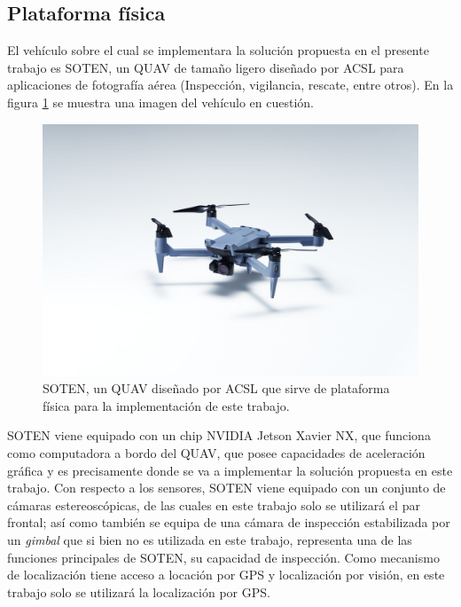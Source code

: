 \subsection{Plataforma física}

El vehículo sobre el cual se implementara la solución propuesta en el presente trabajo es SOTEN, un QUAV de tamaño ligero diseñado por ACSL para aplicaciones de fotografía aérea (Inspección, vigilancia, rescate, entre otros). En la figura \ref{fig:SOTEN} se muestra una imagen del vehículo en cuestión.

\begin{figure}[H]
    \centering
    \includegraphics[scale=0.13]{partes/img/SOTEN.jpg}
    \caption[SOTEN, un QUAV diseñado por ACSL que sirve de plataforma física para la implementación de este trabajo.]{SOTEN, un QUAV diseñado por ACSL que sirve de plataforma física para la implementación de este trabajo.}
    \label{fig:SOTEN}
\end{figure}

SOTEN viene equipado con un chip NVIDIA Jetson Xavier NX, que funciona como computadora a bordo del QUAV, que posee capacidades de aceleración gráfica y es precisamente donde se va a implementar la solución propuesta en este trabajo. Con respecto a los sensores, SOTEN viene equipado con un conjunto de cámaras estereoscópicas, de las cuales en este trabajo solo se utilizará el par frontal; así como también se equipa de una cámara de inspección estabilizada por un \textit{gimbal} que si bien no es utilizada en este trabajo, representa una de las funciones principales de SOTEN, su capacidad de inspección. Como mecanismo de localización tiene acceso a locación por GPS y localización por visión, en este trabajo solo se utilizará la localización por GPS. 

